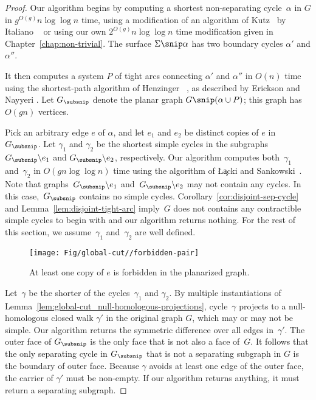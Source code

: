 \begin{proof}
Our algorithm begins by computing a shortest non-separating cycle~$\alpha$ in $G$ in $g^{O(g)}n \log \log n$ time, using a modification of an algorithm of Kutz~\cite{k-csnco-06} by Italiano \etal~\cite{insw-iamcmf-11} or using our own $2^{O(g)}n \log \log n$ time modification given in Chapter~\ref{chap:non-trivial}.  The surface $\Sigma \snip \alpha$ has two boundary cycles $\alpha'$ and $\alpha''$.

It then computes a system $P$ of tight arcs connecting $\alpha'$ and $\alpha''$ in $O(n)$ time using the shortest-path algorithm of Henzinger \etal~\cite{hkrs-fspap-97}, as described by Erickson and Nayyeri \cite{en-mcsnc-11}.  Let $\Gsnip$ denote the planar graph $G \snip (\alpha \cup P)$; this graph has $O(gn)$ vertices.

Pick an arbitrary edge $e$ of $\alpha$, and let $e_1$ and $e_2$ be distinct copies of $e$ in~$\Gsnip$.  Let $\gamma_1$ and $\gamma_2$ be the shortest simple cycles in the  subgraphs $\Gsnip \backslash e_1$ and $\Gsnip \backslash e_2$, respectively.  Our algorithm computes both~$\gamma_1$ and~$\gamma_2$ in $O(gn \log\log n)$ time using the algorithm of \L\c{a}cki and Sankowski~\cite{ls-mcsc-11}. Note that graphs~$\Gsnip \backslash e_1$ and~$\Gsnip \backslash e_2$ may not contain any cycles. In this case,~$\Gsnip$ contains no simple cycles. Corollary~\ref{cor:disjoint-sep-cycle} and Lemma~\ref{lem:disjoint-tight-arc} imply~$G$ does not contains any contractible simple cycles to begin with and our algorithm returns nothing. For the rest of this section, we assume~$\gamma_1$ and~$\gamma_2$ are well defined.

\begin{figure}[t]
\centering
\texttt{[image: Fig/global-cut//forbidden-pair]}
\caption{At least one copy of $e$ is forbidden in the planarized graph.}
\label{fig:global-cut_forbidden-pair}
\end{figure}

Let~$\gamma$ be the shorter of the cycles~$\gamma_1$ and $\gamma_2$.  By multiple instantiations of Lemma~\ref{lem:global-cut_null-homologous-projections}, cycle~$\gamma$ projects to a null-homologous closed walk $\gamma'$ in the original graph $G$, which may or may not be simple.
Our algorithm returns the symmetric difference over all edges in~$\gamma'$. The outer face of $\Gsnip$ is the only face that is not also a face of~$G$.
It follows that the only separating cycle in $\Gsnip$ that is not a separating subgraph in $G$ is the boundary of outer face.  Because $\gamma$ avoids at least one edge of the outer face, the carrier of $\gamma'$ must be non-empty. If our algorithm returns anything, it must return a separating subgraph.


\end{proof}
